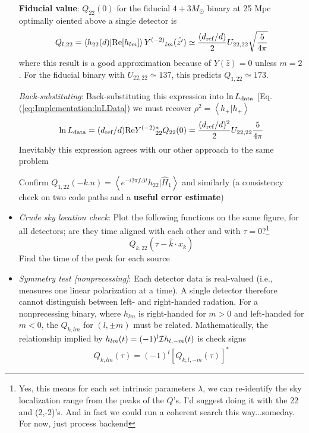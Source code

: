 \documentclass[twocolumn,prd,nofootinbib]{revtex4}
\newcommand\editremark[1]{{\color{red} #1}}
\newcommand\Y[1]{Y^{(#1)}{}}
\newcommand\qmstateproduct[2]{\left\langle#1|#2\right\rangle}
\begin{document}
\begin{widetext}
\begin{itemize}
\begin{shaded}
\noindent \textbf{Fiducial value}: $Q_{22}(0)$ for the fiducial $4+3 M_\odot$ binary at 25 Mpc optimally oiented above a
single detector is
 \begin{eqnarray}
\label{eq:SpecialCase:SingleIFOOptimalOrientation}
 Q_{l,22} = \qmstateproduct{h_{22}(d)}{\text{Re}[h_{lm}]}\Y{-2}_{lm}(\hat{z'}) 
\simeq  \frac{(d_{\rm ref}/d)}{2}  U_{22,22} \sqrt{ \frac{5}{4\pi}}
 \end{eqnarray}
where this result is a good approximation because of $Y(\hat{z})=0$ unless $m=2$. For the fiducial binary with
$U_{22,22}\simeq 137$, this predicts $Q_{1,22}\simeq 173$.

\noindent \emph{Back-substituting}: Back-substituting this expression into $\ln L_{\rm data}$
          [Eq. (\ref{eq:Implementation:lnLData}) we must recover $\rho^2 = \qmstateproduct{h_+}{h_+}$
\begin{eqnarray}
\ln L_{\rm data} = (d_{\rm ref}/d) \text{Re} \Y{-2}_{22}^* Q_{22}(0) = \frac{(d_{\rm ref}/d)^2}{2} U_{22,22} \frac{5}{4\pi}
\end{eqnarray}
Inevitably this expression agrees with our other approach to the same problem
\end{shaded}



Confirm $Q_{1,22}(-k.n) = \qmstateproduct{e^{-i2\pi f \Delta t}h_{22}}{\hat{H}_1}$ and similarly (a consistency check on
two code paths and a \textbf{useful error estimate})


\item \emph{Crude sky location check}: Plot the following functions on the same figure, for all detectors; are they time
  aligned with each other and with $\tau=0$?\footnote{Yes, this means for each set intrinsic parameters $\lambda$, we
    can re-identify the sky localization range from the peaks of the $Q$'s.  I'd suggest doing it with the 22 and
    (2,-2)'s.  And in fact we could run a coherent search this way...someday. For now, just process backend}
\[
Q_{k,22}(\tau-\hat{k}\cdot x_k)
\]
Find the time of the peak for each source

\item \emph{Symmetry test [nonprecessing]}: Each detector data is real-valued (i.e., measures one linear polarization at
  a time).   A single detector therefore cannot distinguish between left- and right-handed radation.  For a
  nonprecessing binary, where $h_{lm}$ is right-handed for $m>0$ and left-handed for $m<0$, the $Q_{k,lm}$ for  $(l,\pm
  m)$  must be related.  Mathematically, the relationship implied by $h_{lm}(t) = (-1)^l{\cal I}h_{l,-m}(t)$ is    \editremark{check signs}
\begin{eqnarray}
Q_{k,lm}(\tau) = (-1)^l [Q_{k,l,-m}(\tau)]^*
\end{eqnarray}



\end{itemize}
\end{widetext}
\end{document}
